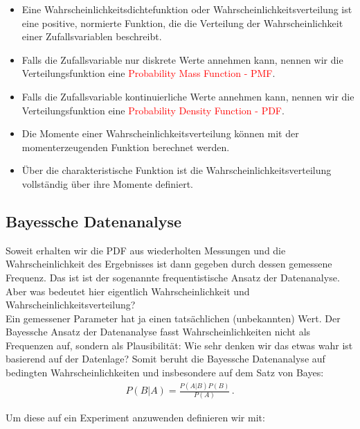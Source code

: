 \begin{itemize}
    \setlength\itemsep{0em}
        \item Eine Wahrscheinlichkeitsdichtefunktion oder Wahrscheinlichkeitsverteilung ist eine positive, normierte Funktion, die die Verteilung der Wahrscheinlichkeit einer Zufallsvariablen beschreibt.
        \item Falls die Zufallsvariable nur diskrete Werte annehmen kann, nennen wir die Verteilungsfunktion eine \textcolor{red}{Probability Mass Function - PMF}.
        \item Falls die Zufallsvariable kontinuierliche Werte annehmen kann, nennen wir die Verteilungsfunktion eine \textcolor{red}{Probability Density Function - PDF}.
        \item Die Momente einer Wahrscheinlichkeitsverteilung k\"onnen mit der momenterzeugenden Funktion berechnet werden.
        \item \"Uber die charakteristische Funktion ist die Wahrscheinlichkeitsverteilung vollst\"andig \"uber ihre Momente definiert.
\end{itemize}


\subsection{Bayessche Datenanalyse}
\label{subsec:vl4-9}

Soweit erhalten wir die PDF aus wiederholten Messungen und die Wahrscheinlichkeit des Ergebnisses ist dann gegeben durch dessen gemessene Frequenz. Das ist ist der sogenannte frequentistische Ansatz der Datenanalyse.\\[0.3 cm]
Aber was bedeutet hier eigentlich Wahrscheinlichkeit und Wahrscheinlichkeitsverteilung?\\[0.3 cm]
Ein gemessener Parameter hat ja einen tats\"achlichen (unbekannten) Wert. Der Bayessche Ansatz der Datenanalyse fasst Wahrscheinlichkeiten nicht als Frequenzen auf, sondern als Plausibilit\"at: Wie sehr denken wir das etwas wahr ist basierend auf der Datenlage? Somit beruht die Bayessche Datenanalyse auf bedingten Wahrscheinlichkeiten und insbesondere auf dem Satz von Bayes:
\begin{align}
P ( B | A) = \frac{ P ( A | B ) P ( B )}{ P ( A ) }\,.
\label{eq:vl4-31}
\end{align}

Um diese auf ein Experiment anzuwenden definieren wir mit:

